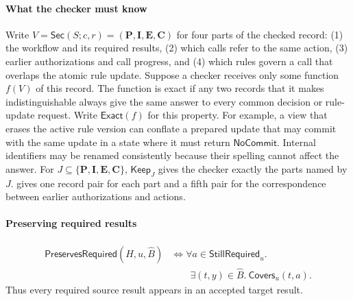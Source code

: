 \paragraph{What the checker must know}
Write \(V=\mathsf{Sec}(S;c,r)
=({\mathbf P},{\mathbf I},{\mathbf E},{\mathbf C})\) for four parts of the checked record: (1) the workflow and its required results, (2) which calls refer to the same action, (3) earlier authorizations and call progress, and (4) which rules govern a call that overlaps the atomic rule update.
Suppose a checker receives only some function \(f(V)\) of this record.
The function is exact if any two records that it makes indistinguishable always give the same answer to every common decision or rule-update request.
Write \(\mathsf{Exact}(f)\) for this property.
For example, a view that erases the active rule version can conflate a prepared update that may commit with the same update in a state where it must return \(\mathsf{NoCommit}\).
Internal identifiers may be renamed consistently because their spelling cannot affect the answer.
For \(J\subseteq\{\mathbf P,\mathbf I,\mathbf E,\mathbf C\}\), \(\mathsf{Keep}_J\) gives the checker exactly the parts named by \(J\).
 gives one record pair for each part and a fifth pair for the correspondence between earlier authorizations and actions.

\paragraph{Preserving required results}
\[
\begin{aligned}
\mathsf{PreservesRequired}(H,u,\widehat B)
&\Longleftrightarrow
\forall a\in\mathsf{StillRequired}_u.\\[-2pt]
&\qquad\exists(t,y)\in\widehat B.\
\mathsf{Covers}_u(t,a).
\end{aligned}
\]
Thus every required source result appears in an accepted target result.

